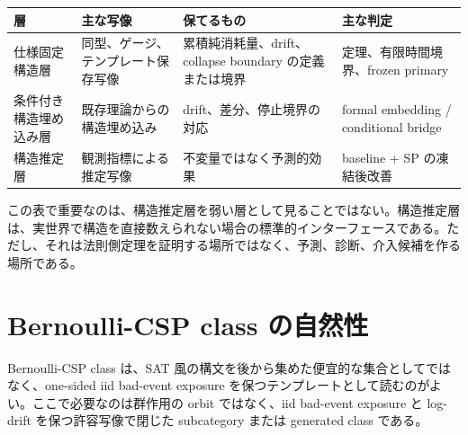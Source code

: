 \documentclass[12pt,a4paper]{article}
\begin{document}
{\def\LTcaptype{table} %
\begin{longtable}[]{@{}
  >{\raggedright\arraybackslash}p{}
  >{\raggedright\arraybackslash}p{}
  >{\raggedright\arraybackslash}p{}
  >{\raggedright\arraybackslash}p{}@{}}
\toprule\noalign{}
\begin{minipage}[b]{\linewidth}\raggedright
層
\end{minipage} & \begin{minipage}[b]{\linewidth}\raggedright
主な写像
\end{minipage} & \begin{minipage}[b]{\linewidth}\raggedright
保てるもの
\end{minipage} & \begin{minipage}[b]{\linewidth}\raggedright
主な判定
\end{minipage} \\
\midrule\noalign{}
\endhead
\bottomrule\noalign{}
\endlastfoot
仕様固定構造層 & 同型、ゲージ、テンプレート保存写像 & 累積純消耗量、drift、collapse boundary の定義または境界 & 定理、有限時間境界、frozen primary \\
条件付き構造埋め込み層 & 既存理論からの構造埋め込み & drift、差分、停止境界の対応 & formal embedding / conditional bridge \\
構造推定層 & 観測指標による推定写像 & 不変量ではなく予測的効果 & baseline + SP の凍結後改善 \\
\end{longtable}
}

この表で重要なのは、構造推定層を弱い層として見ることではない。構造推定層は、実世界で構造を直接数えられない場合の標準的インターフェースである。ただし、それは法則側定理を証明する場所ではなく、予測、診断、介入候補を作る場所である。

\section{Bernoulli-CSP class の自然性}\label{bernoulli-csp-class-ux306eux81eaux7136ux6027}

Bernoulli-CSP class は、SAT 風の構文を後から集めた便宜的な集合としてではなく、one-sided iid bad-event exposure を保つテンプレートとして読むのがよい。ここで必要なのは群作用の orbit ではなく、iid bad-event exposure と log-drift を保つ許容写像で閉じた subcategory または generated class である。
\end{document}
